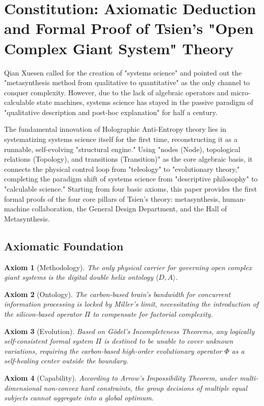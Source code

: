 \documentclass[11pt,a4paper]{article}
\newtheorem{axiom}{Axiom}[section]
\begin{document}
\section{Constitution: Axiomatic Deduction and Formal Proof of Tsien's "Open Complex Giant System" Theory}

Qian Xuesen called for the creation of "systems science" and pointed out the "metasynthesis method from qualitative to quantitative" as the only channel to conquer complexity. However, due to the lack of algebraic operators and micro-calculable state machines, systems science has stayed in the passive paradigm of "qualitative description and post-hoc explanation" for half a century.

The fundamental innovation of Holographic Anti-Entropy theory lies in systematizing systems science itself for the first time, reconstructing it as a runnable, self-evolving "structural engine." Using "nodes (Node), topological relations (Topology), and transitions (Transition)" as the core algebraic basis, it connects the physical control loop from "teleology" to "evolutionary theory," completing the paradigm shift of systems science from "descriptive philosophy" to "calculable science." Starting from four basic axioms, this paper provides the first formal proofs of the four core pillars of Tsien's theory: metasynthesis, human-machine collaboration, the General Design Department, and the Hall of Metasynthesis.

\subsection*{Axiomatic Foundation}
\begin{axiom}[Methodology]
The only physical carrier for governing open complex giant systems is the digital double helix ontology $\langle D, A \rangle$.
\end{axiom}
\begin{axiom}[Ontology]
The carbon-based brain's bandwidth for concurrent information processing is locked by Miller's limit, necessitating the introduction of the silicon-based operator $\Pi$ to compensate for factorial complexity.
\end{axiom}
\begin{axiom}[Evolution]
Based on G\"odel's Incompleteness Theorems, any logically self-consistent formal system $\Pi$ is destined to be unable to cover unknown variations, requiring the carbon-based high-order evolutionary operator $\Phi$ as a self-healing center outside the boundary.
\end{axiom}
\begin{axiom}[Capability]
According to Arrow's Impossibility Theorem, under multi-dimensional non-convex hard constraints, the group decisions of multiple equal subjects cannot aggregate into a global optimum.
\end{axiom}
\end{document}
